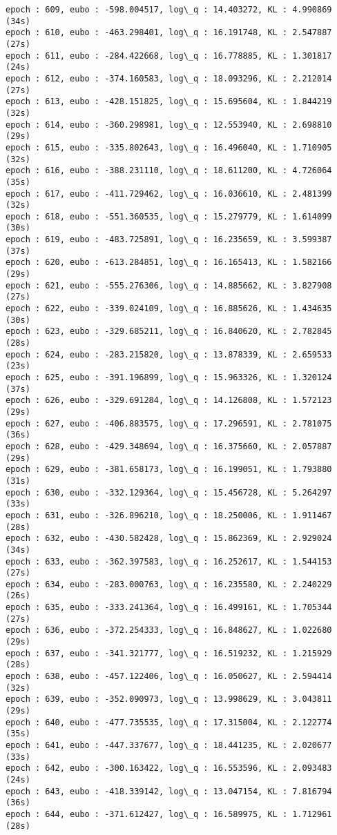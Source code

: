 \documentclass[11pt]{article}
\begin{document}
\begin{Verbatim}[commandchars=\\\{\}]
epoch : 609, eubo : -598.004517, log\_q : 14.403272, KL : 4.990869 (34s)
epoch : 610, eubo : -463.298401, log\_q : 16.191748, KL : 2.547887 (27s)
epoch : 611, eubo : -284.422668, log\_q : 16.778885, KL : 1.301817 (24s)
epoch : 612, eubo : -374.160583, log\_q : 18.093296, KL : 2.212014 (27s)
epoch : 613, eubo : -428.151825, log\_q : 15.695604, KL : 1.844219 (32s)
epoch : 614, eubo : -360.298981, log\_q : 12.553940, KL : 2.698810 (29s)
epoch : 615, eubo : -335.802643, log\_q : 16.496040, KL : 1.710905 (32s)
epoch : 616, eubo : -388.231110, log\_q : 18.611200, KL : 4.726064 (35s)
epoch : 617, eubo : -411.729462, log\_q : 16.036610, KL : 2.481399 (32s)
epoch : 618, eubo : -551.360535, log\_q : 15.279779, KL : 1.614099 (30s)
epoch : 619, eubo : -483.725891, log\_q : 16.235659, KL : 3.599387 (37s)
epoch : 620, eubo : -613.284851, log\_q : 16.165413, KL : 1.582166 (29s)
epoch : 621, eubo : -555.276306, log\_q : 14.885662, KL : 3.827908 (27s)
epoch : 622, eubo : -339.024109, log\_q : 16.885626, KL : 1.434635 (30s)
epoch : 623, eubo : -329.685211, log\_q : 16.840620, KL : 2.782845 (28s)
epoch : 624, eubo : -283.215820, log\_q : 13.878339, KL : 2.659533 (23s)
epoch : 625, eubo : -391.196899, log\_q : 15.963326, KL : 1.320124 (37s)
epoch : 626, eubo : -329.691284, log\_q : 14.126808, KL : 1.572123 (29s)
epoch : 627, eubo : -406.883575, log\_q : 17.296591, KL : 2.781075 (36s)
epoch : 628, eubo : -429.348694, log\_q : 16.375660, KL : 2.057887 (29s)
epoch : 629, eubo : -381.658173, log\_q : 16.199051, KL : 1.793880 (31s)
epoch : 630, eubo : -332.129364, log\_q : 15.456728, KL : 5.264297 (33s)
epoch : 631, eubo : -326.896210, log\_q : 18.250006, KL : 1.911467 (28s)
epoch : 632, eubo : -430.582428, log\_q : 15.862369, KL : 2.929024 (34s)
epoch : 633, eubo : -362.397583, log\_q : 16.252617, KL : 1.544153 (27s)
epoch : 634, eubo : -283.000763, log\_q : 16.235580, KL : 2.240229 (26s)
epoch : 635, eubo : -333.241364, log\_q : 16.499161, KL : 1.705344 (27s)
epoch : 636, eubo : -372.254333, log\_q : 16.848627, KL : 1.022680 (29s)
epoch : 637, eubo : -341.321777, log\_q : 16.519232, KL : 1.215929 (28s)
epoch : 638, eubo : -457.122406, log\_q : 16.050627, KL : 2.594414 (32s)
epoch : 639, eubo : -352.090973, log\_q : 13.998629, KL : 3.043811 (29s)
epoch : 640, eubo : -477.735535, log\_q : 17.315004, KL : 2.122774 (35s)
epoch : 641, eubo : -447.337677, log\_q : 18.441235, KL : 2.020677 (33s)
epoch : 642, eubo : -300.163422, log\_q : 16.553596, KL : 2.093483 (24s)
epoch : 643, eubo : -418.339142, log\_q : 13.047154, KL : 7.816794 (36s)
epoch : 644, eubo : -371.612427, log\_q : 16.589975, KL : 1.712961 (28s)

\end{Verbatim}
\end{document}

